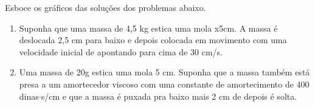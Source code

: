 \begin{frame}
\begin{casa}
Esboce os gráficos das soluções dos problemas abaixo.
\begin{enumerate}
\item Suponha que uma massa de 4,5 kg estica uma mola x5cm. A massa é deslocada  2,5 cm para baixo e depois colocada em movimento  com uma velocidade inicial de apontando para cima de 30 cm/s. 

\item Uma massa de 20g estica uma mola 5 cm. Suponha que a massa também está presa a um amortecedor viscoso com uma constante de amortecimento de 400 dinas$\cdot$s/cm e que a massa é puxada pra baixo mais 2 cm de depois é solta. 
\end{enumerate}
\end{casa}
\end{frame}

